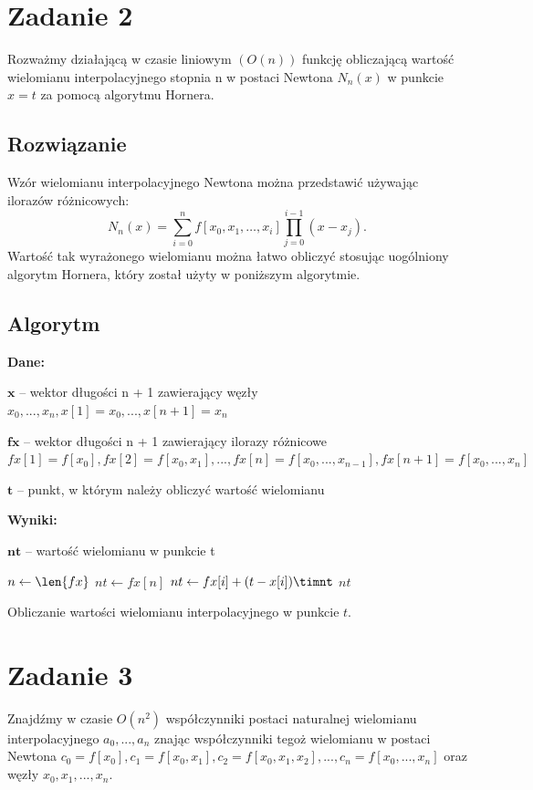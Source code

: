 \documentclass[12pt]{article}
\begin{document}
\section{Zadanie 2}
Rozważmy działającą w czasie liniowym $(O(n))$ funkcję obliczającą wartość wielomianu interpolacyjnego stopnia n w postaci Newtona $N_n(x)$ w punkcie $x=t$ za pomocą algorytmu Hornera. 

\subsection{Rozwiązanie}
Wzór wielomianu interpolacyjnego Newtona można przedstawić używając ilorazów różnicowych:
$$N_n(x) = \sum_{i=0}^n f[x_0,x_{1}, \ldots, x_{i}] \prod_{j=0}^{i-1}(x-x_j).$$
Wartość tak wyrażonego wielomianu można łatwo obliczyć stosując uogólniony algorytm Hornera, który został użyty w poniższym algorytmie.

\subsection{Algorytm}
\textbf{Dane:}\par
$\textbf{x}$ – wektor długości n + 1 zawierający węzły $x_0, ..., x_n, x[1]=x_0, ..., x[n+1]=x_n$\par
$\textbf{fx}$ – wektor długości n + 1 zawierający ilorazy różnicowe
$fx[1]=f[x_0],
fx[2]=f[x_0, x_1], ..., fx[n]=f[x_0, ..., x_{n−1}], fx[n+1]=f[x_0, ..., x_n]$\par
$\textbf{t}$ – punkt, w którym należy obliczyć wartość wielomianu\newline\par
\textbf{Wyniki:}\par
$\textbf{nt}$ – wartość wielomianu w punkcie t
\begin{algorithm}[h]
	\DontPrintSemicolon
     {
        $n \gets \len{fx}$\;
		$nt \gets fx[n]$\;
	   	 {
	  		$nt \gets fx[i] + (t - x[i]) \timnt$\; 		
		}
		\KwRet $nt$\;
    }
    \caption{Obliczanie wartości wielomianu interpolacyjnego w punkcie $t$.}
\end{algorithm}	


\section{Zadanie 3}
Znajdźmy w czasie $O(n^2)$ współczynniki postaci naturalnej wielomianu interpolacyjnego $a_0, ..., a_n$ znając współczynniki tegoż wielomianu w postaci Newtona $c_0=f[x_0], c_1=f[x_0, x_1], c_2=f[x_0, x_1, x_2], ..., c_n=f[x_0, ..., x_n]$ oraz węzły $x_0, x_1, ..., x_n$.
\end{document}
